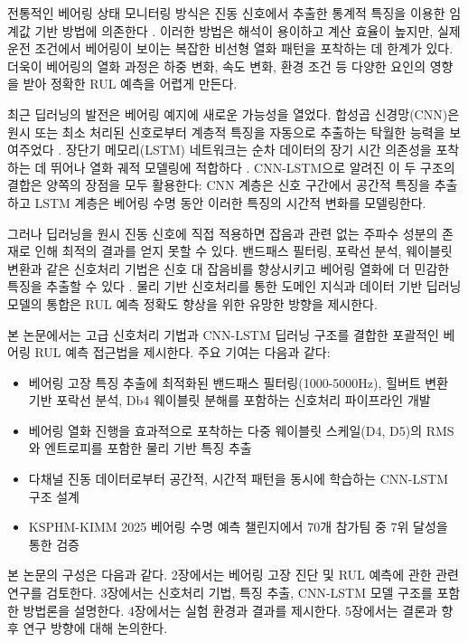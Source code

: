 \documentclass[conference,twocolumn]{IEEEtran}
\begin{document}
전통적인 베어링 상태 모니터링 방식은 진동 신호에서 추출한 통계적 특징을 이용한 임계값 기반 방법에 의존한다 \cite{jardine2006review}. 이러한 방법은 해석이 용이하고 계산 효율이 높지만, 실제 운전 조건에서 베어링이 보이는 복잡한 비선형 열화 패턴을 포착하는 데 한계가 있다. 더욱이 베어링의 열화 과정은 하중 변화, 속도 변화, 환경 조건 등 다양한 요인의 영향을 받아 정확한 RUL 예측을 어렵게 만든다.

최근 딥러닝의 발전은 베어링 예지에 새로운 가능성을 열었다. 합성곱 신경망(CNN)은 원시 또는 최소 처리된 신호로부터 계층적 특징을 자동으로 추출하는 탁월한 능력을 보여주었다 \cite{zhang2017new}. 장단기 메모리(LSTM) 네트워크는 순차 데이터의 장기 시간 의존성을 포착하는 데 뛰어나 열화 궤적 모델링에 적합하다 \cite{zhao2017machine}. CNN-LSTM으로 알려진 이 두 구조의 결합은 양쪽의 장점을 모두 활용한다: CNN 계층은 신호 구간에서 공간적 특징을 추출하고 LSTM 계층은 베어링 수명 동안 이러한 특징의 시간적 변화를 모델링한다.

그러나 딥러닝을 원시 진동 신호에 직접 적용하면 잡음과 관련 없는 주파수 성분의 존재로 인해 최적의 결과를 얻지 못할 수 있다. 밴드패스 필터링, 포락선 분석, 웨이블릿 변환과 같은 신호처리 기법은 신호 대 잡음비를 향상시키고 베어링 열화에 더 민감한 특징을 추출할 수 있다 \cite{antoni2007fast}. 물리 기반 신호처리를 통한 도메인 지식과 데이터 기반 딥러닝 모델의 통합은 RUL 예측 정확도 향상을 위한 유망한 방향을 제시한다.

본 논문에서는 고급 신호처리 기법과 CNN-LSTM 딥러닝 구조를 결합한 포괄적인 베어링 RUL 예측 접근법을 제시한다. 주요 기여는 다음과 같다:

\begin{itemize}
    \item 베어링 고장 특징 추출에 최적화된 밴드패스 필터링(1000-5000Hz), 힐버트 변환 기반 포락선 분석, Db4 웨이블릿 분해를 포함하는 신호처리 파이프라인 개발
    \item 베어링 열화 진행을 효과적으로 포착하는 다중 웨이블릿 스케일(D4, D5)의 RMS와 엔트로피를 포함한 물리 기반 특징 추출
    \item 다채널 진동 데이터로부터 공간적, 시간적 패턴을 동시에 학습하는 CNN-LSTM 구조 설계
    \item KSPHM-KIMM 2025 베어링 수명 예측 챌린지에서 70개 참가팀 중 7위 달성을 통한 검증
\end{itemize}

본 논문의 구성은 다음과 같다. 2장에서는 베어링 고장 진단 및 RUL 예측에 관한 관련 연구를 검토한다. 3장에서는 신호처리 기법, 특징 추출, CNN-LSTM 모델 구조를 포함한 방법론을 설명한다. 4장에서는 실험 환경과 결과를 제시한다. 5장에서는 결론과 향후 연구 방향에 대해 논의한다.
\end{document}
